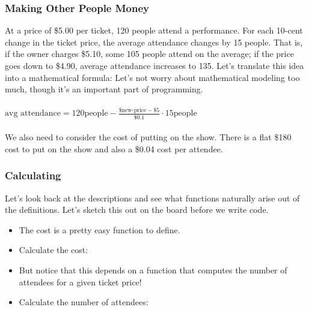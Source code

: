 \documentclass{beamer}
\begin{document}
\begin{frame}
  \frametitle{Making Other People Money}
  At a price of \$5.00 per ticket, 120 people attend a performance. For each 10-cent change in the ticket price, the average attendance changes by 15 people. That is, if the owner charges \$5.10, some 105 people attend on the average; if the price goes down to \$4.90, average attendance increases to 135. Let’s translate this idea into a mathematical formula:
  \pause
  Let's not worry about mathematical modeling too much, though  it's an important
  part of programming.
  \\ \\
  \pause
  $\text{avg attendance}=120\text{people}-\frac{\text{\$new-price}-\$5}{\$0.1} \cdot 15 \text{people}$
  \\ \\
  \pause
  We also need to consider the cost of putting on the show. There is a flat \$180
  cost to put on the show and also a \$0.04 cost per attendee.
\end{frame}


\begin{frame}
  \frametitle{Calculating}
  Let's look back at the descriptions and see what functions naturally arise
  out of the definitions. Let's sketch this out on the board before we write code.
  \begin{itemize}
  \item<2-> The cost is a pretty easy function to define.
  \item<3-> Calculate the cost: \cost
  \item<4-> But notice that this depends on a function that computes the number
    of attendees for a given ticket price!
  \item<5-> Calculate the number of attendees: \attendees    
  \end{itemize}
\end{frame}

\end{document}
